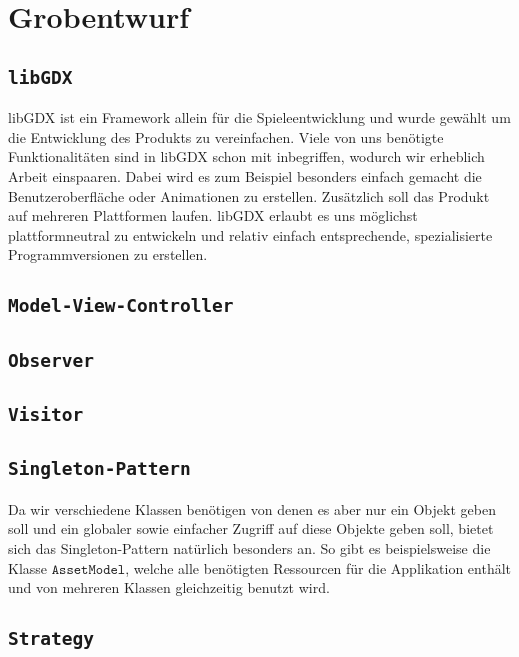 \section{Grobentwurf}

\subsection{\texttt{libGDX}}
libGDX ist ein Framework allein für die Spieleentwicklung und wurde gewählt um die Entwicklung des Produkts zu vereinfachen.
Viele von uns benötigte Funktionalitäten sind in libGDX schon mit inbegriffen, wodurch wir erheblich Arbeit einspaaren.
Dabei wird es zum Beispiel besonders einfach gemacht die Benutzeroberfläche oder Animationen zu erstellen.
Zusätzlich soll das Produkt auf mehreren Plattformen laufen. libGDX erlaubt es uns möglichst plattformneutral zu entwickeln 
und relativ einfach entsprechende, spezialisierte Programmversionen zu erstellen.

\subsection{\texttt{Model-View-Controller}}

\subsection{\texttt{Observer}}

\subsection{\texttt{Visitor}}

\subsection{\texttt{Singleton-Pattern}}
Da wir verschiedene Klassen benötigen von denen es aber nur ein Objekt geben soll und ein globaler sowie einfacher Zugriff auf diese Objekte geben soll, bietet sich das Singleton-Pattern natürlich besonders an. So gibt es beispielsweise die Klasse $\texttt{AssetModel}$, welche alle benötigten Ressourcen für die Applikation enthält und von mehreren Klassen gleichzeitig benutzt wird.


\subsection{\texttt{Strategy}}
